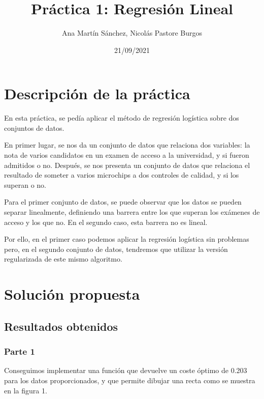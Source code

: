 \documentclass[11pt]{article}
\title{Práctica 1: Regresión Lineal}
\author{Ana Martín Sánchez, Nicolás Pastore Burgos}
\date{21/09/2021}
\begin{document}
\maketitle

\section{Descripción de la práctica}

 En esta práctica, se pedía aplicar el método de regresión logística sobre dos conjuntos de datos. 
 
 En primer lugar, se nos da un conjunto de datos que relaciona dos variables: la nota de varios candidatos en un examen de acceso a la universidad, y si fueron admitidos o no.
 Después, se nos presenta un conjunto de datos que relaciona el resultado de someter a varios microchips a dos controles de calidad, y si los superan o no.

Para el primer conjunto de datos, se puede observar que los datos se pueden separar linealmente, definiendo una barrera entre los que superan los exámenes de acceso y los que no. En el segundo caso, esta barrera no es lineal.

Por ello, en el primer caso podemos aplicar la regresión logística sin problemas pero, en el segundo conjunto de datos, tendremos que utilizar la versión regularizada de este mismo algoritmo.


\newpage
\section{Solución propuesta}

\subsection{Resultados obtenidos}

\subsubsection {Parte 1}

Conseguimos implementar una función que devuelve un coste óptimo de 0.203 para los datos proporcionados, y que permite dibujar una recta como se muestra en la figura 1.
\end{document}
